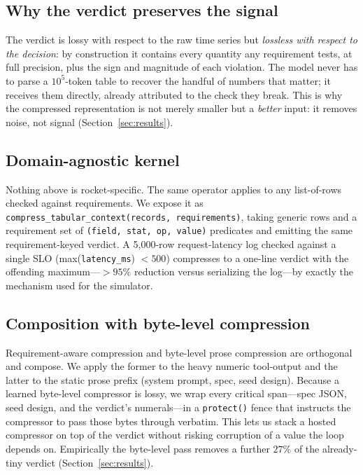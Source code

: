 \documentclass[10pt,twocolumn]{article}
\begin{document}
\subsection{Why the verdict preserves the signal}

The verdict is lossy with respect to the raw time series but \emph{lossless with
respect to the decision}: by construction it contains every quantity any
requirement tests, at full precision, plus the sign and magnitude of each
violation. The model never has to parse a $10^5$-token table to recover the handful
of numbers that matter; it receives them directly, already attributed to the check
they break. This is why the compressed representation is not merely smaller but a
\emph{better} input: it removes noise, not signal (Section~\ref{sec:results}).

\subsection{Domain-agnostic kernel}

Nothing above is rocket-specific. The same operator applies to any list-of-rows
checked against requirements. We expose it as
\texttt{compress\_tabular\_context(records, requirements)}, taking generic rows and
a requirement set of \texttt{(field, stat, op, value)} predicates and emitting the
same requirement-keyed verdict. A 5{,}000-row request-latency log checked against a
single SLO (\textsf{max}(\texttt{latency\_ms}) $<500$) compresses to a one-line
verdict with the offending maximum---$>\!95\%$ reduction versus serializing the
log---by exactly the mechanism used for the simulator.

\subsection{Composition with byte-level compression}
\label{sec:protect}

Requirement-aware compression and byte-level prose compression are orthogonal and
compose. We apply the former to the heavy numeric tool-output and the latter to the
static prose prefix (system prompt, spec, seed design). Because a learned
byte-level compressor is lossy, we wrap every critical span---spec JSON, seed
design, and the verdict's numerals---in a \texttt{protect()} fence that instructs
the compressor to pass those bytes through verbatim. This lets us stack a hosted
compressor on top of the verdict without risking corruption of a value the loop
depends on. Empirically the byte-level pass removes a further $27\%$ of the
already-tiny verdict (Section~\ref{sec:results}).
\end{document}
